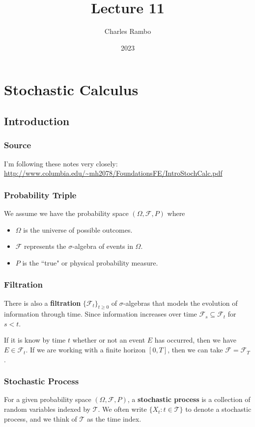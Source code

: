 \documentclass{beamer}
\title{Lecture 11}
\author{Charles Rambo}
\institute{UCLA Anderson School of Management}
\date{2023}
\begin{document}
\insertTitleSlide

\section{Stochastic Calculus} 

\subsection{Introduction} 

\begin{frame}
\frametitle{Source} 
I'm following these notes very closely: \url{http://www.columbia.edu/~mh2078/FoundationsFE/IntroStochCalc.pdf}
\end{frame}

\begin{frame}
\frametitle{Probability Triple}
We assume we have the probability space $(\Omega, \mathcal{F}, P)$ where
\begin{itemize}
\item $\Omega$ is the universe of possible outcomes.
\item $\mathcal{F}$ represents the $\sigma$-algebra of events in $\Omega$.
\item $P$ is the ``true" or physical probability measure.
\end{itemize}
\end{frame}

\begin{frame}
\frametitle{Filtration}
There is also a {\bf filtration} $\{\mathcal{F}_t\}_{t\geq 0}$ of $\sigma$-algebras that models the evolution of information through time. Since information increases over time $\mathcal{F}_s \subseteq \mathcal{F}_t$ for $s < t$.

If it is know by time $t$ whether or not an event $E$ has occurred, then we have $E\in\mathcal{F}_t$. If we are working with a finite horizon $[0, T]$, then we can take $\mathcal{F} = \mathcal{F}_T$.
\end{frame}

\begin{frame}
\frametitle{Stochastic Process}

\begin{Definition}
For a given probability space $(\Omega, \mathcal{F}, P)$, a {\bf stochastic process} is a collection of random variables indexed by $\mathcal{T}$. We often write $\{X_t : t \in\mathcal{T}\}$ to denote a stochastic process, and we think of $\mathcal{T}$ as the time index.
\end{Definition}
\end{frame}
\end{document}
